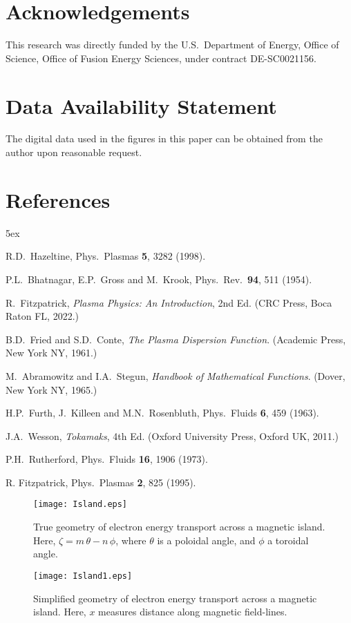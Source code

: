 \documentclass[12pt,prb,aps]{revtex4-1}
\begin{document}
\section*{Acknowledgements}
This research was directly funded by the U.S.\ Department of Energy, Office of Science, Office of Fusion Energy Sciences, under  contract DE-SC0021156. 

\section*{Data Availability Statement}
The digital data used in the figures in this paper can be obtained from the author upon reasonable request.

\section*{References}
\begin{thebibliography}{99}\baselineskip 5ex

 R.D.~Hazeltine, Phys.\ Plasmas {\bf 5}, 3282 (1998).

 P.L.~Bhatnagar, E.P.~Gross and M.~Krook, Phys.\ Rev.\ {\bf 94}, 511 (1954).

 R.~Fitzpatrick, {\em Plasma Physics: An Introduction}, 2nd Ed. (CRC Press, Boca Raton FL, 2022.)

 B.D.~Fried and S.D.~Conte, {\em The Plasma Dispersion Function}. (Academic Press, New York NY, 1961.)

 M.~Abramowitz and I.A.~Stegun, {\em Handbook of Mathematical Functions}. (Dover, New York NY, 1965.)

 H.P.~Furth,  J.~Killeen and M.N.~Rosenbluth,  Phys.\ Fluids {\bf 6}, 459 (1963).

 J.A.~Wesson, {\em Tokamaks}, 4th Ed. (Oxford University Press, Oxford UK, 2011.)

 P.H.~Rutherford, Phys.\ Fluids {\bf 16}, 1906 (1973).

 R. Fitzpatrick, Phys.\ Plasmas {\bf 2}, 825 (1995).

\end{thebibliography}

\begin{figure}
\centerline{\texttt{[image: Island.eps]}}
\caption{True geometry of electron energy transport across a magnetic island. Here, $\zeta= m\,\theta-n\,\phi$, where $\theta$ is a poloidal angle, and $\phi$ a
toroidal angle.  \label{fig1}}
\end{figure}

\begin{figure}
\centerline{\texttt{[image: Island1.eps]}}
\caption{Simplified geometry of electron energy transport across a magnetic island. Here, $x$ measures distance along magnetic field-lines.  \label{fig2}}
\end{figure}
\end{document}

